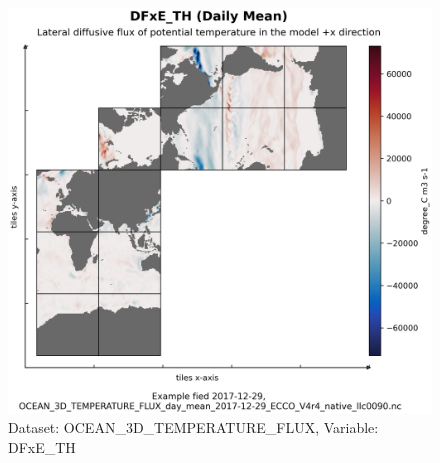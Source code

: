 \begin{figure}[H]
\centering
\includegraphics[scale=0.55]{../images/plots/native_plots/Ocean_Three-Dimensional_Potential_Temperature_Fluxes/DFxE_TH.png}
\caption{Dataset: OCEAN\_3D\_TEMPERATURE\_FLUX, Variable: DFxE\_TH}
\label{tab:table-OCEAN_3D_TEMPERATURE_FLUX_DFxE_TH-Plot}
\end{figure}
\pagebreak
